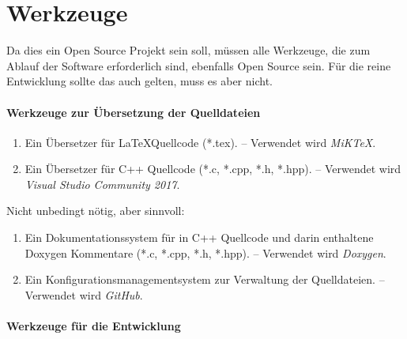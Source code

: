 \section{Werkzeuge}%
\label{sec:Werkzeuge}

Da dies ein Open Source Projekt sein soll,
müssen alle Werkzeuge,
die zum Ablauf der Software erforderlich sind,
ebenfalls Open Source sein.
Für die reine Entwicklung sollte das auch gelten, muss es aber nicht.

\paragraph{Werkzeuge zur Übersetzung der Quelldateien}%

\begin{enumerate}
	
	\item\label{Werkzeug:LaTeX}
	Ein Übersetzer für \LaTeX Quellcode (*.tex).
	-- Verwendet wird \emph{MiK\TeX}.
	
	\item\label{Werkzeug:C++}
	Ein Übersetzer für C++ Quellcode (*.c, *.cpp, *.h, *.hpp).
	-- Verwendet wird \emph{Visual Studio Community 2017}.
	
	\setcounter{Enumi}{\value{enumi}}%
\end{enumerate}
Nicht unbedingt nötig, aber sinnvoll:
\begin{enumerate}
	\setcounter{enumi}{\value{Enumi}}%
	
	\item\label{Werkzeug:Dokumentation}
	Ein Dokumentationssystem für in C++ Quellcode und darin enthaltene Doxygen Kommentare (*.c, *.cpp, *.h, *.hpp).
	-- Verwendet wird \emph{Doxygen}.
	
	\item\label{Werkzeug:Konfigurationsmanagement}
	Ein Konfigurationsmanagementsystem zur Verwaltung der Quelldateien.
	-- Verwendet wird \emph{GitHub}.
	
	\setcounter{Enumi}{\value{enumi}}%
\end{enumerate}

\paragraph{Werkzeuge für die Entwicklung}%

